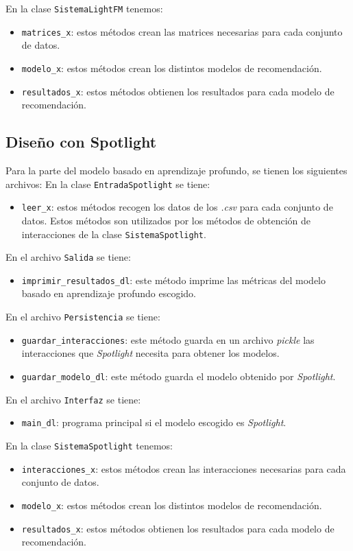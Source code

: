En la clase \texttt{SistemaLightFM} tenemos:
\begin{itemize}
\tightlist
\item \texttt{matrices\_x}: estos métodos crean las matrices necesarias para cada conjunto de datos. 
\item \texttt{modelo\_x}: estos métodos crean los distintos modelos de recomendación. 
\item \texttt{resultados\_x}: estos métodos obtienen los resultados para cada modelo de recomendación. 
\end{itemize}

\subsection{Diseño con Spotlight}\label{diseño-spotlight}
Para la parte del modelo basado en aprendizaje profundo, se tienen los siguientes archivos:
En la clase \texttt{EntradaSpotlight} se tiene:
\begin{itemize}
\tightlist
\item \texttt{leer\_x}: estos métodos recogen los datos de los \textit{.csv} para cada conjunto de datos. Estos métodos son utilizados por los métodos de obtención de interacciones de la clase \texttt{SistemaSpotlight}.
\end{itemize}

En el archivo \texttt{Salida} se tiene:
\begin{itemize}
\tightlist
\item \texttt{imprimir\_resultados\_dl}: este método imprime las métricas del modelo basado en aprendizaje profundo escogido.
\end{itemize}

En el archivo \texttt{Persistencia} se tiene:
\begin{itemize}
\tightlist
\item \texttt{guardar\_interacciones}: este método guarda en un archivo \textit{pickle} las interacciones que \textit{Spotlight} necesita para obtener los modelos.
\item \texttt{guardar\_modelo\_dl}: este método guarda el modelo obtenido por \textit{Spotlight}.
\end{itemize}

En el archivo \texttt{Interfaz} se tiene:
\begin{itemize}
\tightlist 
\item \texttt{main\_dl}: programa principal si el modelo escogido es \textit{Spotlight}. 
\end{itemize}

En la clase \texttt{SistemaSpotlight} tenemos:
\begin{itemize}
\tightlist
\item \texttt{interacciones\_x}: estos métodos crean las interacciones necesarias para cada conjunto de datos. 
\item \texttt{modelo\_x}: estos métodos crean los distintos modelos de recomendación. 
\item \texttt{resultados\_x}: estos métodos obtienen los resultados para cada modelo de recomendación. 
\end{itemize}

